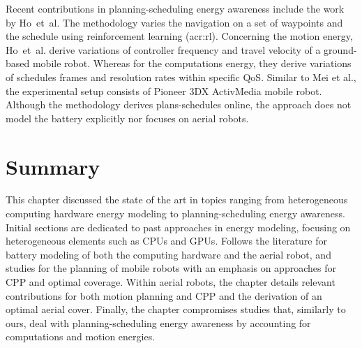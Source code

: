 Recent contributions in planning-scheduling energy awareness include the work~\citep{ho2019learning,ho2019qos,ho2018towards} by Ho~et~al. The methodology varies the navigation on a set of waypoints and the schedule using reinforcement learning (\Gls{acr:rl}). Concerning the motion energy, Ho~et~al. derive variations of controller frequency and travel velocity of a ground-based mobile robot. Whereas for the computations energy, they derive variations of schedules frames and resolution rates within specific QoS. Similar to Mei et al., the experimental setup consists of Pioneer 3DX ActivMedia mobile robot. Although the methodology derives plans-schedules online, the approach does not model the battery explicitly nor focuses on aerial robots.


\section{Summary}

This chapter discussed the state of the art in topics ranging from heterogeneous computing hardware energy modeling to planning-scheduling energy awareness. Initial sections are dedicated to past approaches in energy modeling, focusing on heterogeneous elements such as CPUs and GPUs. Follows the literature for battery modeling of both the computing hardware and the aerial robot, and studies for the planning of mobile robots with an emphasis on approaches for CPP and optimal coverage. Within aerial robots, the chapter details relevant contributions for both motion planning and CPP and the derivation of an optimal aerial cover. Finally, the chapter compromises studies that, similarly to ours, deal with planning-scheduling energy awareness by accounting for computations and motion energies.




